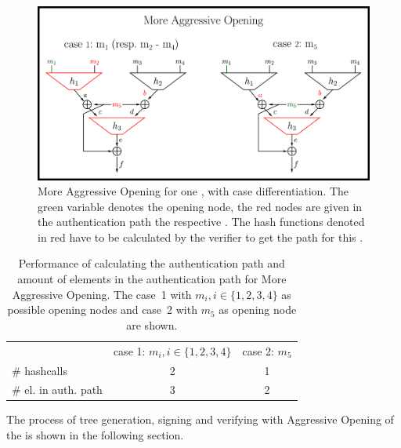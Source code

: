 \begin{figure}
\centering
\includegraphics[]{images/Methods/more_aggr_opening.png}
\caption{More Aggressive Opening for one \tfblock, with case differentiation. The green variable denotes the opening node, the red nodes are given in the authentication path the respective \tfblock. The hash functions denoted in red have to be calculated by the verifier to get the path for this \tfblock.}
\label{img:t5_more_aggr_opening}
\end{figure}

\begin{table}
\centering
\begin{tabular}{l c c} 
 \hline\noalign{\smallskip}
 \multicolumn{3}{c}{\textbf{More Aggressive Opening}} \\
 \hline\noalign{\smallskip}
 & case 1: $m_i, i \in \{1,2,3,4\}$ & case 2: $m_5$ \\
 \# hashcalls & 2 & 1 \\
 \# el. in auth. path & 3 & 2 \\
 \hline
\end{tabular}
\caption{Performance of calculating the authentication path and amount of elements in the authentication path for More Aggressive Opening. The case~1 with $m_i, i \in \{1,2,3,4\}$ as possible opening nodes and case~2 with $m_5$ as opening node are shown.}
\label{table:more_aggr_opening}
\end{table}
The process of tree generation, signing and verifying with Aggressive Opening  of the \extree is shown in the following section. 

